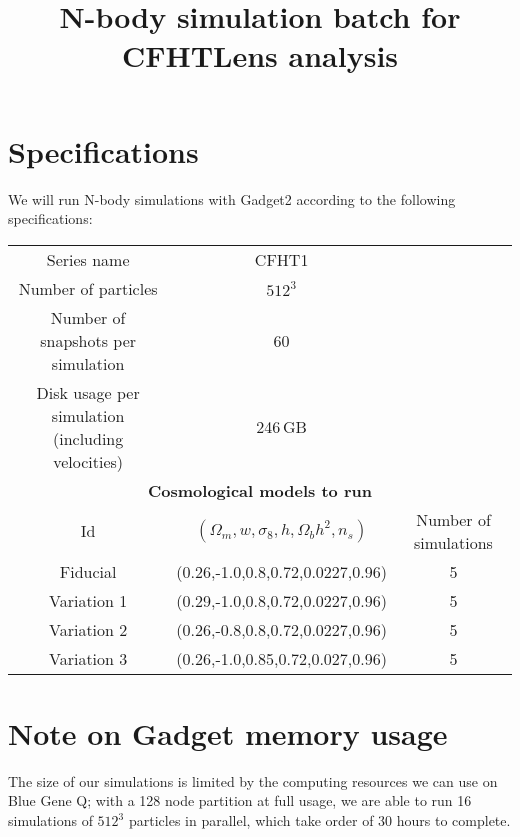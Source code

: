 \documentclass[11pt]{article}
\begin{document}
\title{N-body simulation batch for CFHTLens analysis}
\author{}
\date{}

\maketitle

\section*{Specifications}

We will run N-body simulations with Gadget2 according to the following specifications:

\begin{table}[h!]
\begin{center}
\begin{tabular}{ccc} \hline
Series name & CFHT1 & \\
Number of particles & $512^3$ & \\ 
Number of snapshots per simulation & 60 & \\
Disk usage per simulation (including velocities) & 246\,GB& \\ \hline
\multicolumn{3}{c}{\textbf{Cosmological models to run}} \\
Id & $(\Omega_m,w,\sigma_8,h,\Omega_bh^2,n_s)$ & Number of simulations\\ \hline
Fiducial & (0.26,-1.0,0.8,0.72,0.0227,0.96) & 5 \\
Variation 1 & (0.29,-1.0,0.8,0.72,0.0227,0.96) & 5 \\
Variation 2 & (0.26,-0.8,0.8,0.72,0.0227,0.96) & 5 \\
Variation 3 & (0.26,-1.0,0.85,0.72,0.027,0.96) & 5 \\ \hline
\end{tabular}
\end{center}
\end{table}

\section*{Note on Gadget memory usage}
The size of our simulations is limited by the computing resources we can use on Blue Gene Q; with a 128 node partition at full usage, we are able to run 16 simulations of $512^3$ particles in parallel, which take order of 30 hours to complete. 
\end{document}
